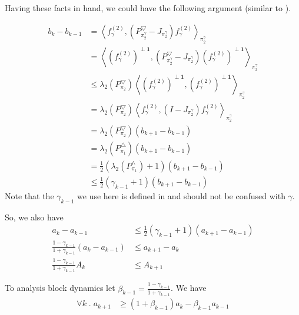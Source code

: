 \documentclass{article}
\def\<{\left\langle}
\def\>{\right\rangle}
\begin{document}
Having these facts in hand, we could have the following argument (similar to \cite{alev2020improved}).

\begin{align*}
  b_{k} - b_{k-1}
  &= \<f^{(2)}_\gamma, (P_{\pi_2^\gamma}^{\bigtriangledown} - J_{\pi_2^\gamma})f^{(2)}_\gamma\>_{\pi_2^\gamma} \\
  &= \<(f^{(2)}_\gamma)^{\perp \mathbf{1}}, (P_{\pi_2^\gamma}^{\bigtriangledown} - J_{\pi_2^\gamma})(f^{(2)}_\gamma)^{\perp \mathbf{1}}\>_{\pi_2^\gamma} \\
  &\leq \lambda_2(P_{\pi_2}^\bigtriangledown)\<(f^{(2)}_\gamma)^{\perp \mathbf{1}}, (f^{(2)}_\gamma)^{\perp \mathbf{1}}\>_{\pi_2^\gamma} \\
  &= \lambda_2(P_{\pi_2}^\bigtriangledown)\<f^{(2)}_\gamma, (I - J_{\pi_2^\gamma}) f^{(2)}_\gamma\>_{\pi_2^\gamma} \\
  &= \lambda_2(P_{\pi_2}^\bigtriangledown) (b_{k+1} - b_{k-1}) \\
  &= \lambda_2(P_{\pi_1}^\bigtriangleup) (b_{k+1} - b_{k-1}) \\
  &= \frac{1}{2}(\lambda_2(P_{\pi_1}^\land) + 1) (b_{k+1} - b_{k-1}) \\
  &\leq \frac{1}{2}(\gamma_{k-1} + 1) (b_{k+1} - b_{k-1})
\end{align*}
Note that the $\gamma_{k-1}$ we use here is defined in \cite{alev2020improved} and should not be confused with $\gamma$.

So, we also have
\begin{align*}
  a_k - a_{k-1} &\leq \frac{1}{2}(\gamma_{k-1} + 1) (a_{k+1} - a_{k-1}) \\
  \frac{1 - \gamma_{k-1}}{1 + \gamma_{k-1}} (a_k - a_{k-1}) &\leq a_{k+1} - a_k \\
  \frac{1 - \gamma_{k-1}}{1 + \gamma_{k-1}} A_k & \leq A_{k+1}
\end{align*}

To analysis block dynamics let $\beta_{k-1} = \frac{1 - \gamma_{k-1}}{1 + \gamma_{k-1}}$.
We have
\begin{align*}
  \forall k \;.\; a_{k+1} &\geq (1 + \beta_{k-1})a_k - \beta_{k-1}a_{k-1} \\
\end{align*}
\end{document}
